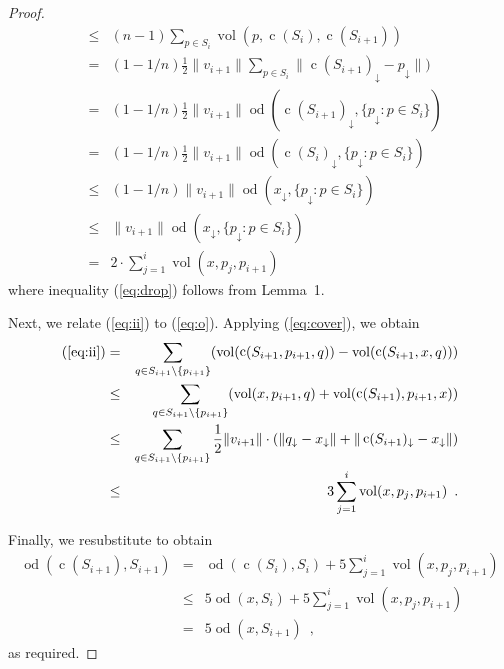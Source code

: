 \documentclass{article}
\DeclareMathOperator{\od}{od}
\DeclareMathOperator{\vol}{vol}
\DeclareMathOperator{\cog}{c}
\newcommand{\drop}{\downarrow}
\begin{document}
\begin{proof}
\begin{eqnarray}
   & \le & (n-1)\sum_{p\in S_i} \vol(p,\cog(S_i),\cog(S_{i+1})) \\
   & = & (1-1/n)\frac{1}{2}\|v_{i+1}\|\sum_{p\in
S_i}\|\cog(S_{i+1})_\drop-p_\drop\|) \\
   & = & (1-1/n)\frac{1}{2}\|v_{i+1}\|\od(\cog(S_{i+1})_\drop,
\{p_\drop:p\in S_{i}\}) \\
   & = & (1-1/n)\frac{1}{2}\|v_{i+1}\|\od(\cog(S_{i})_\drop,
\{p_\drop:p\in S_{i}\}) \\
   & \le & (1-1/n)\|v_{i+1}\|\od(x_\drop, \{p_\drop:p\in S_{i}\})
     \label{eq:drop} \\ 
   & \le & \|v_{i+1}\|\od(x_\drop, \{p_\drop:p\in S_{i}\}) \\
   & = & 2\cdot \sum_{j=1}^i \vol(x,p_j,p_{i+1}) 
\end{eqnarray}
where inequality (\ref{eq:drop}) follows from Lemma~1.

Next, we relate (\ref{eq:ii}) to (\ref{eq:o}).    Applying (\ref{eq:cover}), we obtain
\begin{eqnarray*}
 (\ref{eq:ii})  
     &=&  \sum_{q\in S_{i+1}\setminus \{p_{i+1}\}}
          (\vol(\cog(S_{i+1},p_{i+1},q)) - \vol(\cog(S_{i+1},x,q))) \\
     &\le &  \sum_{q\in S_{i+1}\setminus \{p_{i+1}\}} 
              (\vol(x,p_{i+1},q) + \vol(\cog(S_{i+1}),p_{i+1},x)) \\
     &\le &  
            \sum_{q\in S_{i+1}\setminus \{p_{i+1}\}} 
              \frac{1}{2}\|v_{i+1}\|\cdot(\|q_\drop-x_\drop\|
                 + \|\cog(S_{i+1})_\drop-x_\drop\|) \\
     &\le &  3\sum_{j=1}^i \vol(x,p_j,p_{i+1}) \enspace .
\end{eqnarray*}

Finally, we resubstitute to obtain
\begin{eqnarray*}
\od(\cog(S_{i+1}),S_{i+1}) 
  & = & \od(\cog(S_{i}),S_{i}) + 5 \sum_{j=1}^i \vol(x,p_j,p_{i+1}) \\
  &\le& 5\od(x,S_{i}) + 5 \sum_{j=1}^i \vol(x,p_j,p_{i+1}) \\
  & = & 5\od(x,S_{i+1}) \enspace ,
\end{eqnarray*}
as required.
\end{proof}
\end{document}
